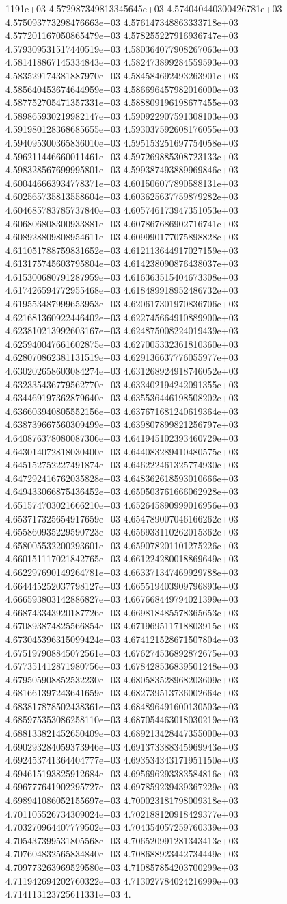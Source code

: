 1191e+03	4.572987349813345645e+03	4.574040440300426781e+03	4.575093773298476663e+03	4.576147348863333718e+03	4.577201167050865479e+03	4.578255227916936747e+03	4.579309531517440519e+03	4.580364077908267063e+03	4.581418867145334843e+03	4.582473899284559593e+03	4.583529174381887970e+03	4.584584692493263901e+03	4.585640453674644959e+03	4.586696457982016000e+03	4.587752705471357331e+03	4.588809196198677455e+03	4.589865930219982147e+03	4.590922907591308103e+03	4.591980128368685655e+03	4.593037592608176055e+03	4.594095300365836010e+03	4.595153251697754058e+03	4.596211446660011461e+03	4.597269885308723133e+03	4.598328567699995801e+03	4.599387493889969846e+03	4.600446663934778371e+03	4.601506077890588131e+03	4.602565735813558604e+03	4.603625637759879282e+03	4.604685783785737840e+03	4.605746173947351053e+03	4.606806808300933881e+03	4.607867686902716741e+03	4.608928809808954611e+03	4.609990177075898828e+03	4.611051788759831652e+03	4.612113644917027159e+03	4.613175745603795804e+03	4.614238090876438037e+03	4.615300680791287959e+03	4.616363515404673308e+03	4.617426594772955468e+03	4.618489918952486732e+03	4.619553487999653953e+03	4.620617301970836706e+03	4.621681360922446402e+03	4.622745664910889900e+03	4.623810213992603167e+03	4.624875008224019439e+03	4.625940047661602875e+03	4.627005332361810360e+03	4.628070862381131519e+03	4.629136637776055977e+03	4.630202658603084274e+03	4.631268924918746052e+03	4.632335436779562770e+03	4.633402194242091355e+03	4.634469197362879640e+03	4.635536446198508202e+03	4.636603940805552156e+03	4.637671681240619364e+03	4.638739667560309499e+03	4.639807899821256797e+03	4.640876378080087306e+03	4.641945102393460729e+03	4.643014072818030400e+03	4.644083289410480575e+03	4.645152752227491874e+03	4.646222461325774930e+03	4.647292416762035828e+03	4.648362618593010666e+03	4.649433066875436452e+03	4.650503761666062928e+03	4.651574703021666210e+03	4.652645890999016956e+03	4.653717325654917659e+03	4.654789007046166262e+03	4.655860935229590723e+03	4.656933110262015362e+03	4.658005532200293601e+03	4.659078201101275226e+03	4.660151117021842765e+03	4.661224280018869649e+03	4.662297690149264781e+03	4.663371347469929788e+03	4.664445252037798127e+03	4.665519403909796893e+03	4.666593803142886827e+03	4.667668449794021399e+03	4.668743343920187726e+03	4.669818485578365653e+03	4.670893874825566854e+03	4.671969511718803915e+03	4.673045396315099424e+03	4.674121528671507804e+03	4.675197908845072561e+03	4.676274536892872675e+03	4.677351412871980756e+03	4.678428536839501248e+03	4.679505908852532230e+03	4.680583528968203609e+03	4.681661397243641659e+03	4.682739513736002664e+03	4.683817878502438361e+03	4.684896491600130503e+03	4.685975353086258110e+03	4.687054463018030219e+03	4.688133821452650409e+03	4.689213428447355000e+03	4.690293284059373946e+03	4.691373388345969943e+03	4.692453741364404777e+03	4.693534343171951150e+03	4.694615193825912684e+03	4.695696293383584816e+03	4.696777641902295727e+03	4.697859239439367229e+03	4.698941086052155697e+03	4.700023181798009318e+03	4.701105526734309024e+03	4.702188120918429377e+03	4.703270964407779502e+03	4.704354057259760339e+03	4.705437399531805568e+03	4.706520991281343413e+03	4.707604832565834840e+03	4.708688923442734449e+03	4.709773263969529580e+03	4.710857854203700299e+03	4.711942694202760322e+03	4.713027784024216999e+03	4.714113123725611331e+03	4.